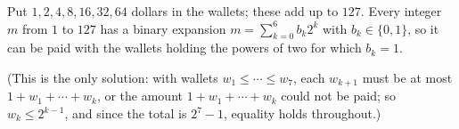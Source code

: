 Put $1,2,4,8,16,32,64$ dollars in the wallets; these add up to $127$. Every integer $m$ from $1$ to $127$ has a binary expansion $m=\sum_{k=0}^{6}b_k2^k$ with $b_k\in\{0,1\}$, so it can be paid with the wallets holding the powers of two for which $b_k=1$.

(This is the only solution: with wallets $w_1\le\cdots\le w_7$, each $w_{k+1}$ must be at most $1+w_1+\cdots+w_k$, or the amount $1+w_1+\cdots+w_k$ could not be paid; so $w_k\le2^{k-1}$, and since the total is $2^7-1$, equality holds throughout.)
